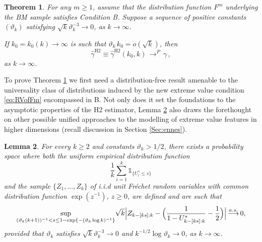 \documentclass[11pt, a4paper, oneside]{article}
\numberwithin{equation}{section}
\theoremstyle{plain}
\newtheorem{thm}{Theorem}
\newtheorem{lem}[thm]{Lemma}
\theoremstyle{definition}
\newcommand{\sumab}[2]{\ensuremath{\sum\limits_{#1}^{#2}}}
\newcommand{\suprem}[1]{\ensuremath{\displaystyle {\sup_{#1}}}}
\newcommand{\conv}[1]{\ensuremath{\, \displaystyle {\mathop{\longrightarrow}^{#1}}}\, }
\newcommand{\one}{\mathds{1}}
\begin{document}
\begin{thm}\label{Thm:ConsistencyHybHill}
For any $m \geq 1$, assume that the distribution function $F^m$ underlying the BM sample satisfies Condition B. Suppose a sequence of positive constants $(\vartheta_k)$   satisfying $\sqrt{k}\vartheta^{-3}_k \rightarrow 0$, as $k \rightarrow \infty$.

\noindent If $k_0=k_0(k) \rightarrow \infty$ is such that $\vartheta_k\, k_0 = o(\sqrt{k})$, then
    \begin{equation*}
         \hat{\gamma}^{\textrm{H2}}\equiv \hat{\gamma}^{\textrm{H2}} (k_0, k) \conv{P} \gamma \,,
    \end{equation*}
    as $k \rightarrow \infty$.
\end{thm}
To prove Theorem \ref{Thm:ConsistencyHybHill} we first need a distribution-free result amenable to the universality class of distributions induced by the new extreme value condition \eqref{eq:RVofFm} encompassed in B. Not only does it set the foundations to the asymptotic properties of the H2 estimator, Lemma \ref{Lem:BasicEmpProcess} also draws the forethought on other possible unified approaches to the modelling of extreme value features in higher dimensions (recall discussion in Section \ref{Sec:ennes}).

\begin{lem}\label{Lem:BasicEmpProcess}
   For every $k\geq 2$ and constants $\vartheta_k > 1/2$, there exists a probability space where both the uniform empirical distribution function
\begin{equation*} 
	\frac{1}{k} \sumab{i=1}{k}\one_{\{U_{i}^{*}\leq s\}}
\end{equation*}
and the sample $ \{Z_{1},\ldots,Z_{k}\}$ of i.i.d unit Fr\'echet random variables with common distribution function $\exp(z^{-1})$, $z\geq0$, are defined and are such that 
    \begin{equation*}
            \suprem{(\vartheta_k (k+1))^{-1}< s \leq 1- \exp\{-(\vartheta_k \log k)^{-1} \} } \sqrt{k} \Bigl| Z_{k-[ks]:k}-\Bigl(\frac{1}{1-U^{*}_{k-[ks]:k}}- \frac{1}{2}\Bigr)\Bigl|\conv{a.s.} 0,
    \end{equation*}
provided that $\vartheta_k$ satisfies $\sqrt{k}\vartheta_k^{-3} \rightarrow 0$ and $k^{-1/2}\log \vartheta_k \rightarrow 0$, as $k \rightarrow \infty$.
\end{lem}
\end{document}
